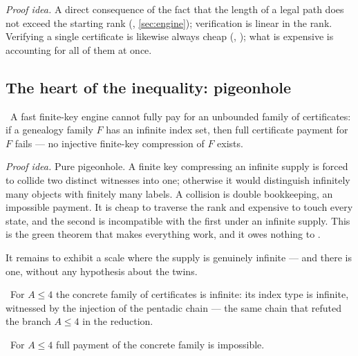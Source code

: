 \emph{Proof idea.} A direct consequence of the fact that the length of a legal path does not
exceed the starting rank (, \cref{sec:engine}); verification is linear in the
rank. Verifying a single certificate is likewise always cheap (,
\green{}); what is expensive is accounting for all of them at once.

\subsection{The heart of the inequality: pigeonhole}

\begin{theorem}\label{thm:no_fullPayment_of_unboundedSupply}
\green{}\ A fast finite-key engine cannot fully pay for an unbounded family of certificates: if a
genealogy family $F$ has an infinite index set, then full certificate payment for $F$ fails --- no
injective finite-key compression of $F$ exists. 
\end{theorem}

\emph{Proof idea.} Pure pigeonhole. A finite key compressing an infinite supply is forced to
collide two distinct witnesses into one; otherwise it would distinguish infinitely many objects
with finitely many labels. A collision is double bookkeeping, an impossible payment. It is cheap to
traverse the rank and expensive to touch every state, and the second is incompatible with the
first under an infinite supply. This is the green theorem that makes everything work, and it owes
nothing to \axiom{}.

It remains to exhibit a scale where the supply is genuinely infinite --- and there is one, without
any hypothesis about the twins.

\begin{theorem}\label{thm:concreteSupply_unbounded_smallScale}
\green{}\ For $A \le 4$ the concrete family of certificates is infinite: its index type is infinite,
witnessed by the injection of the pentadic chain  --- the same chain that
refuted the branch $A \le 4$ in the reduction. 
\end{theorem}

\begin{corollary}\label{thm:concrete_noFullPayment_smallScale}
\green{}\ For $A \le 4$ full payment of the concrete family is impossible.
\end{corollary}

